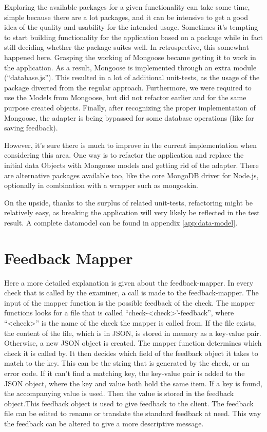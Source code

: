 Exploring the available packages for a given functionality can take some time,
simple because there are a lot packages, and it can be intensive to get a good
idea of the quality and usability for the intended usage. Sometimes it's
tempting to start building functionality for the application based on a package
while in fact still deciding whether the package suites well. In retrospective,
this somewhat happened here. Grasping the working of Mongoose became getting it
to work in the application. As a result, Mongoose is implemented through an 
extra module (``database.js''). This resulted in a lot of additional 
unit-tests, as the usage of the package diverted from the regular approach. 
Furthermore, we were required to use the Models from Mongoose, but did not
refactor earlier and for the same purpose created objects. Finally, after 
recognizing the proper implementation of Mongoose, the adapter is being bypassed
for some database operations (like for saving feedback).

However, it's sure there is much to improve
in the current implementation when considering this area. One way is to refactor
the application and replace the initial data Objects with Mongoose models and
getting rid of the adapter. There are alternative packages available too, like 
the core MongoDB driver for Node.js, optionally in combination with a wrapper 
such as mongoskin. 

On the upside, thanks to the surplus of related unit-tests, refactoring might be 
relatively easy, as breaking the application will very likely be reflected in 
the test result. A complete datamodel can be found in 
appendix \ref{app:data-model}.

\section{Feedback Mapper}
Here a more detailed explanation is given about the feedback-mapper.
In every \gls{check} that is called by the \gls{examiner}, a call is made to the
feedback-mapper.
The input of the mapper function is the possible feedback of the \gls{check}.
The mapper functions looks for a file that is called 
``check-\textless check\textgreater'-feedback'',
where ``\textless check\textgreater'' is the name of the \gls{check} the mapper 
is called from. If the file exists, the content of the file, which is in JSON,
is stored in memory as a key-value pair.
Otherwise, a new JSON object is created.
The mapper function determines which \gls{check} it is called by.
It then decides which field of the feedback object it takes to match to the key.
This can be the string that is generated by the \gls{check}, or an error code. 
If it can't find a matching key, the key-value pair is added to the JSON object,
where the key and value both hold the same item.
If a key is found, the accompanying value is used. Then the value is stored in 
the feedback object.This feedback object is used to give feedback to the client.
The feedback file can be edited to rename or translate the standard feedback at 
need. This way the feedback can be altered to give a more descriptive message.
    
